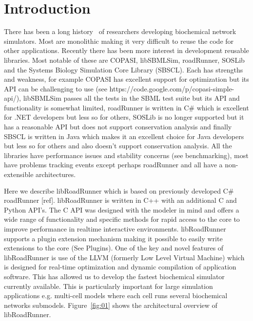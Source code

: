 \documentclass{bioinfo}
\begin{document}
\section{Introduction}

There has been a long history~\citep{Bag01} of researchers developing biochemical network simulators. Most are monolithic making it very difficult to reuse the code for other applications. Recently there has been more interest in development reusable libraries. Most notable of these are COPASI, libSBMLSim, roadRunner, SOSLib and the Systems Biology Simulation Core Library (SBSCL). Each has strengths and weakness, for example COPASI has excellent support for optimization but its API can be challenging to use (see https://code.google.com/p/copasi-simple-api/), libSBMLSim passes all the tests in the SBML test suite but its API and functionality is somewhat limited, roadRunner is written in C\# which is excellent for .NET developers but less so for others, SOSLib is no longer supported but it has a reasonable API but does not support conservation analysis and finally SBSCL is written in Java which makes it an excellent choice for Java developers but less so for others and also doesn't support conservation analysis. All the libraries have performance issues and stability concerns (see benchmarking), most have problems tracking events except perhaps roadRunner and all have a non-extensible architectures.

Here we describe libRoadRunner which is based on previously developed C\# roadRunner [ref]. libRoadRunner is written in C++ with an additional C and Python API's. The C API was designed with the modeler in mind and offers a wide range of functionality and specific methods for rapid access to the core to improve performance in realtime interactive environments. libRoadRunner supports a plugin extension mechanism making it possible to easily write extensions to the core (See Plugins). One of the key and novel features of libRoadRunner is use of the LLVM (formerly Low Level Virtual Machine) which is designed for real-time optimization and dynamic compilation of application software. This has allowed us to develop the fastest biochemical simulator currently available. This is particularly important for large simulation applications e.g. multi-cell models where each cell runs several biochemical networks submodels. Figure~\ref{fig:01} shows the architectural overview of libRoadRunner.
\end{document}

